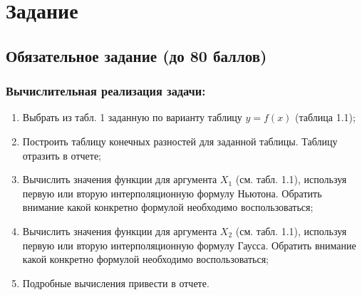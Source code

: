 \documentclass{article}
\begin{document}
\itmo[
      variant=13,
      labn=5,
      discipline=Вычислительная математика,
      group=P3212,
      student=Соколов Анатолий Владимирович,
      teacher=Наумова Надежда Александровна 
]
\lstset{language=rust}
\tableofcontents
\section{Задание}
      \subsection{Обязательное задание (до 80 баллов)}
            \subsubsection{Вычислительная реализация задачи:}
                  \begin{enumerate}
                        \item Выбрать из табл. 1 заданную по варианту таблицу $y = f(x)$ (таблица 1.1);
                        \item Построить таблицу конечных разностей для заданной таблицы. Таблицу отразить в отчете;
                        \item Вычислить значения функции для аргумента $X_1$ (см. табл. 1.1), используя первую или вторую интерполяционную формулу Ньютона. Обратить внимание какой конкретно формулой необходимо воспользоваться;
                        \item Вычислить значения функции для аргумента $X_2$ (см. табл. 1.1), используя первую или вторую интерполяционную формулу Гаусса. Обратить внимание какой конкретно формулой необходимо воспользоваться;
                        \item Подробные вычисления привести в отчете.
                  \end{enumerate}
\end{document}
